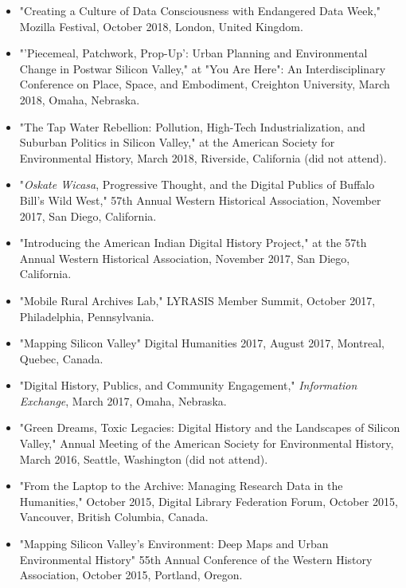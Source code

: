 \documentclass[10pt]{article}
\begin{document}
\begin{itemize}
  \item "Creating a Culture of Data Consciousness with Endangered Data Week," Mozilla Festival, October 2018, London, United Kingdom.
  
  \item "'Piecemeal, Patchwork, Prop-Up': Urban Planning and Environmental Change in Postwar Silicon Valley," at "You Are Here": An Interdisciplinary Conference on Place, Space, and Embodiment, Creighton University, March 2018, Omaha, Nebraska.
  
  \item "The Tap Water Rebellion: Pollution, High-Tech Industrialization, and Suburban Politics in Silicon Valley," at the American Society for Environmental History, March 2018, Riverside, California (did not attend).
  
  \item "\textit{Oskate Wicasa}, Progressive Thought, and the Digital Publics of Buffalo Bill's Wild West," 57th Annual Western Historical Association, November 2017, San Diego, California.
  
  \item "Introducing the American Indian Digital History Project," at the 57th Annual Western Historical Association, November 2017, San Diego, California.
  
  \item "Mobile Rural Archives Lab," LYRASIS Member Summit, October 2017, Philadelphia, Pennsylvania.
  
  \item "Mapping Silicon Valley" Digital Humanities 2017, August 2017, Montreal, Quebec, Canada.
  
  \item "Digital History, Publics, and Community Engagement," \textit{Information Exchange}, March 2017, Omaha, Nebraska.
  
  \item "Green Dreams, Toxic Legacies: Digital History and the Landscapes of Silicon Valley," Annual Meeting of the American Society for Environmental History, March 2016, Seattle, Washington (did not attend).
  
  \item "From the Laptop to the Archive: Managing Research Data in the Humanities," October 2015, Digital Library Federation Forum, October 2015, Vancouver, British Columbia, Canada.
  
  \item "Mapping Silicon Valley's Environment: Deep Maps and Urban Environmental History" 55th Annual Conference of the Western History Association, October 2015, Portland, Oregon.
  

\end{itemize}
\end{document}
